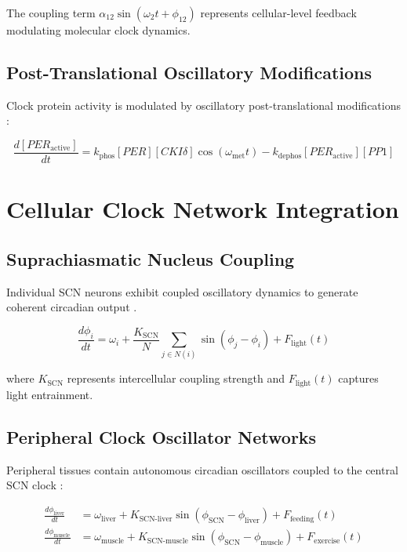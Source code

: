 \documentclass[twocolumn]{article}
\begin{document}
The coupling term $\alpha_{12} \sin(\omega_2 t + \phi_{12})$ represents cellular-level feedback modulating molecular clock dynamics.

\subsection{Post-Translational Oscillatory Modifications}

Clock protein activity is modulated by oscillatory post-translational modifications \citep{hirano2016casein}:

\begin{equation}
\frac{d[PER_{\text{active}}]}{dt} = k_{\text{phos}} [PER] [CKI\delta] \cos(\omega_{\text{met}} t) - k_{\text{dephos}} [PER_{\text{active}}] [PP1]
\label{eq:per_modification}
\end{equation}

\section{Cellular Clock Network Integration}

\subsection{Suprachiasmatic Nucleus Coupling}

Individual SCN neurons exhibit coupled oscillatory dynamics to generate coherent circadian output \citep{welsh2010suprachiasmatic}.

\begin{equation}
\frac{d\phi_i}{dt} = \omega_i + \frac{K_{\text{SCN}}}{N} \sum_{j \in N(i)} \sin(\phi_j - \phi_i) + F_{\text{light}}(t)
\label{eq:scn_coupling}
\end{equation}

where $K_{\text{SCN}}$ represents intercellular coupling strength and $F_{\text{light}}(t)$ captures light entrainment.

\subsection{Peripheral Clock Oscillator Networks}

Peripheral tissues contain autonomous circadian oscillators coupled to the central SCN clock \citep{yamazaki2000resetting}:

\begin{align}
\frac{d\phi_{\text{liver}}}{dt} &= \omega_{\text{liver}} + K_{\text{SCN-liver}} \sin(\phi_{\text{SCN}} - \phi_{\text{liver}}) + F_{\text{feeding}}(t) \label{eq:liver_clock} \\
\frac{d\phi_{\text{muscle}}}{dt} &= \omega_{\text{muscle}} + K_{\text{SCN-muscle}} \sin(\phi_{\text{SCN}} - \phi_{\text{muscle}}) + F_{\text{exercise}}(t) \label{eq:muscle_clock}
\end{align}
\end{document}
